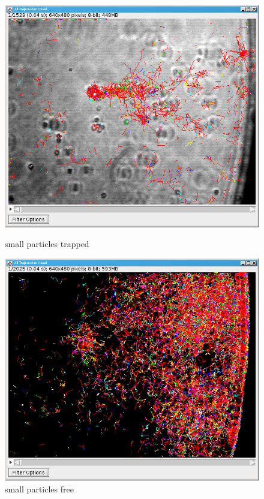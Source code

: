 \documentclass[a4paper,12pt,twoside]{article}	%
\begin{document}
\begin{figure}
\centering
\begin{minipage}{.5\textwidth}
	\centering
	\includegraphics[width=.95\linewidth]{./figures/traj_petit_trap}
	\caption{small particles trapped}
	\label{fig:test1}
\end{minipage}%
\begin{minipage}{.5\textwidth}
	\centering
	\includegraphics[width=.95\linewidth]{./figures/traj_petit_free}
	\caption{small particles free}
	\label{fig:test2}
\end{minipage}
\end{figure}
\end{document}
